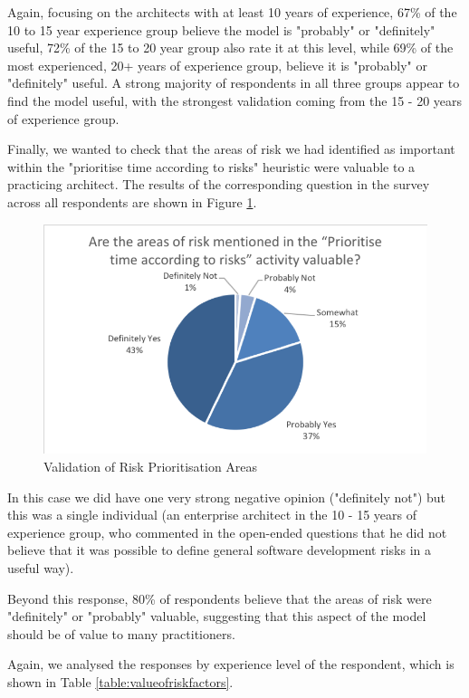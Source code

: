 Again, focusing on the architects with at least 10 years of experience, 67\% of the 10 to 15 year experience group believe the model is "probably" or "definitely" useful, 72\% of the 15 to 20 year group also rate it at this level, while 69\% of the most experienced, 20+ years of experience group, believe it is "probably" or "definitely" useful.  A strong majority of respondents in all three groups appear to find the model useful, with the strongest validation coming from the 15 - 20 years of experience group.

Finally, we wanted to check that the areas of risk we had identified as important within the "prioritise time according to risks" heuristic were valuable to a practicing architect.  The results of the corresponding question in the survey across all respondents are shown in Figure \ref{figure:validationofareas}.

\begin{figure}[h]
\centering
\includegraphics[width=12cm,trim={2 2 2 2},clip]{Figures/prioritisation-riskareas}
\caption{Validation of Risk Prioritisation Areas}
\label{figure:validationofareas}
\end{figure}

In this case we did have one very strong negative opinion ("definitely not") but this was a single individual (an enterprise architect in the 10 - 15 years of experience group, who commented in the open-ended questions that he did not believe that it was possible to define general software development risks in a useful way).

Beyond this response, 80\% of respondents believe that the areas of risk were "definitely" or "probably" valuable, suggesting that this aspect of the model should be of value to many practitioners.

Again, we analysed the responses by experience level of the respondent, which is shown in Table \ref{table:valueofriskfactors}.


